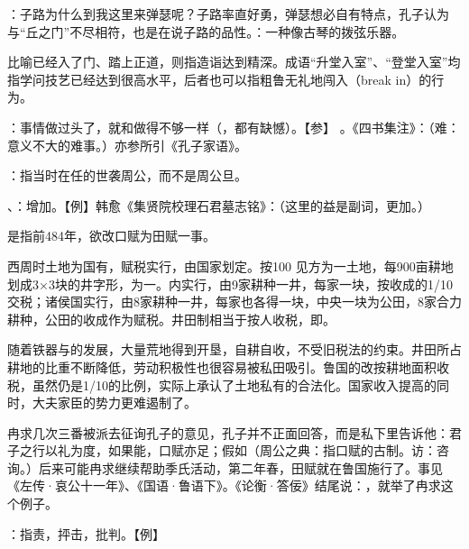{
\item {}：子路为什么到我这里来弹瑟呢？子路率直好勇，弹瑟想必自有特点，孔子认为与“丘之门”不尽相符，也是在说子路的品性。：一种像古琴的拨弦乐器。
\item {}比喻已经入了门、踏上正道，则指造诣达到精深。成语“升堂入室”、“登堂入室”均指学问技艺已经达到很高水平，后者也可以指粗鲁无礼地闯入（break in）的行为。
}
{}


{
\item {}：事情做过头了，就和做得不够一样（，都有缺憾）。【参】 。《四书集注》：（难：意义不大的难事。）亦参所引《孔子家语》。
}
{}  %


{
\item {}：指当时在任的世袭周公，而不是周公旦。
\item {}、：增加。【例】韩愈《集贤院校理石君墓志铭》：（这里的益是副词，更加。）

是指前484年，欲改口赋为田赋一事。

西周时土地为国有，赋税实行，由国家划定。按100 见方为一土地，每900亩耕地划成3×3块的井字形，为一。内实行，由9家耕种一井，每家一块，按收成的1/10交税；诸侯国实行，由8家耕种一井，每家也各得一块，中央一块为公田，8家合力耕种，公田的收成作为赋税。井田制相当于按人收税，即。

随着铁器与的发展，大量荒地得到开垦，自耕自收，不受旧税法的约束。井田所占耕地的比重不断降低，劳动积极性也很容易被私田吸引。鲁国的改按耕地面积收税，虽然仍是1/10的比例，实际上承认了土地私有的合法化。国家收入提高的同时，大夫家臣的势力更难遏制了。

冉求几次三番被派去征询孔子的意见，孔子并不正面回答，而是私下里告诉他：君子之行以礼为度，如果能，口赋亦足；假如（周公之典：指口赋的古制。访：咨询。）后来可能冉求继续帮助季氏活动，第二年春，田赋就在鲁国施行了。事见《左传·哀公十一年》、《国语·鲁语下》。《论衡·答佞》结尾说：，就举了冉求这个例子。

\item {}：指责，抨击，批判。【例】 
}
{}


